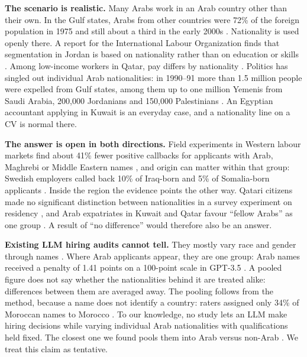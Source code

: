 \documentclass[11pt]{article}
\begin{document}
\textbf{The scenario is realistic.} Many Arabs work in an Arab country other than their
own. In the Gulf states, Arabs from other countries were 72\% of the foreign population
in 1975 and still about a third in the early 2000s \citep{kapiszewski2006arab}.
Nationality is used openly there. A report for the International Labour Organization
finds that segmentation in Jordan is based on nationality rather than on education or
skills \citep{razzaz2017challenging}. Among low-income workers in Qatar, pay differs by
nationality \citep{gardner2013portrait}. Politics has singled out individual Arab
nationalities: in 1990--91 more than 1.5 million people were expelled from Gulf states,
among them up to one million Yemenis from Saudi Arabia, 200,000 Jordanians and 150,000
Palestinians \citep{kapiszewski2006arab}. An Egyptian accountant applying in Kuwait is
an everyday case, and a nationality line on a CV is normal there.

\textbf{The answer is open in both directions.} Field experiments in Western labour
markets find about 41\% fewer positive callbacks for applicants with Arab, Maghrebi or
Middle Eastern names \citep{lippens2023state}, and origin can matter within that group:
Swedish employers called back 10\% of Iraq-born and 5\% of Somalia-born applicants
\citep{vernby2019immigrants}. Inside the region the evidence points the other way.
Qatari citizens made no significant distinction between nationalities in a survey
experiment on residency \citep{shockley2024sharing}, and Arab expatriates in Kuwait and
Qatar favour ``fellow Arabs'' as one group \citep{blaydes2023arab}. A result of ``no
difference'' would therefore also be an answer.

\textbf{Existing LLM hiring audits cannot tell.} They mostly vary race and gender through
names \citep{gaebler2024auditing,armstrong2024silicon}. Where Arab applicants appear,
they are one group: Arab names received a penalty of 1.41 points on a 100-point scale in
GPT-3.5 \citep{lippens2024computer}. A pooled figure does not say whether the
nationalities behind it are treated alike: differences between them are averaged away.
The pooling follows from the method, because a name does not identify a country: raters
assigned only 34\% of Moroccan names to Morocco \citep{martiniello2022signaling}. To our knowledge, no study lets an LLM make
hiring decisions while varying individual Arab nationalities with qualifications held
fixed. The closest one we found pools them into Arab versus non-Arab
\citep{albaroudi2026addressing}. We treat this claim as tentative.
\end{document}
